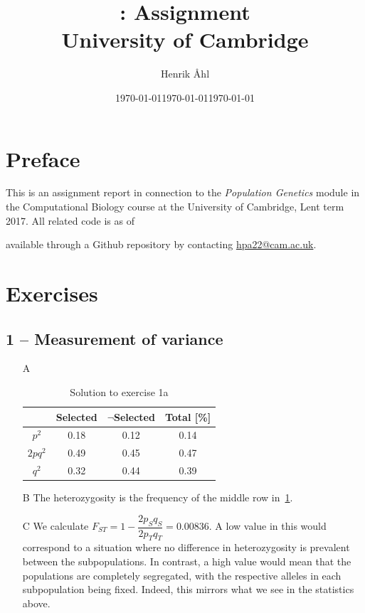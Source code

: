 \documentclass[10pt]{article}\usepackage[]{graphicx}\usepackage[]{color}
\title{
  \bf \course: Assignment \ass \\[1em]
  \small{University of Cambridge}
}
\author{Henrik Åhl}
\date{\today}
\theoremstyle{plain}
\newcommand{\course}{Population Genetics}
\newcommand{\term}{Lent term 2017}
\begin{document}
\date{\today}
\maketitle
\setcounter{page}{1}


\maketitle

\begin{multicols*}{2}
\section*{Preface}
This is an assignment report in connection to the \textit{\course}
module in the Computational Biology course at the University of Cambridge,
\term. All related code is as of \date{\today} available through a
Github repository by contacting \href{mailto:hpa22@cam.ac.uk}{hpa22@cam.ac.uk}.

\section*{Exercises}
\subsection*{1 -- Measurement of variance}
\begin{enumerate}
  \item[A]~
    \begin{table}[H]
      \centering
      \vspace{-.6cm}
      \caption{Solution to exercise 1a}\label{tab:exc1}
      \begin{tabular}{c|ccc}
        \toprule
        &Selected  & $\neg$Selected  & Total [\%]\\
        \midrule
        $p^2$ &0.18  & 0.12  & 0.14 \\
        $2pq^2$ &0.49  & 0.45  & 0.47 \\
        $q^2$ &0.32  & 0.44  & 0.39 \\\bottomrule
      \end{tabular}
    \end{table}
  \item[B] The heterozygosity is the frequency of the middle row in~\cref{tab:exc1}.
  \item[C] We calculate $F_{ST} = 1 - \dfrac{2p_Sq_S}{2p_Tq_T} = 0.00836$. A low value in this would correspond to a situation where no
    difference in heterozygosity is prevalent between the subpopulations. In
    contrast, a high value would mean that the populations are completely
    segregated, with the respective alleles in each subpopulation being fixed. Indeed, this mirrors what we see in the statistics above. 
\end{enumerate}


\end{multicols*}
\end{document}
